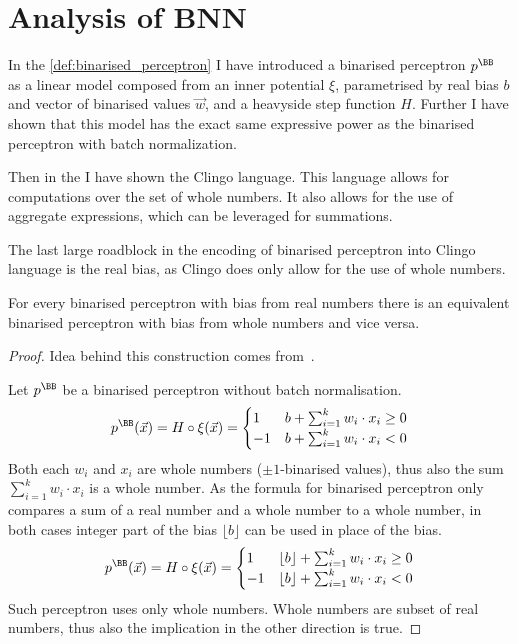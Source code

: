 \section{Analysis of BNN}

In the \cref{def:binarised_perceptron} I have introduced a binarised perceptron $p^\BB$
as a linear model composed from an inner potential $\xi$, parametrised by
real bias $b$ and vector of binarised values $\vec w$, and a heavyside step function $H$.
Further I have shown that this model has the exact same expressive power
as the binarised perceptron with batch normalization.

Then in the  I have shown the Clingo language. This language allows
for computations over the set of whole numbers. It also allows for the use
of aggregate expressions, which can be leveraged for summations.

The last large roadblock in the encoding of binarised perceptron into Clingo language
is the real bias, as Clingo does only allow for the use of whole numbers.

\begin{lemma}\label{lem:integer_perceptron}
    For every binarised perceptron with bias from real numbers
    there is an equivalent binarised perceptron
    with bias from whole numbers and vice versa.

    \begin{proof}
        Idea behind this construction comes from~\cite{zhang2021bdd4bnn}.

        Let $p^\BB$ be a binarised perceptron without batch normalisation.
        \[p^\BB(\vec x) = H \circ \xi (\vec x) = \begin{cases}
            1 & b + \sum_{i=1}^k w_i \cdot x_i \geq 0\\
            -1 & b + \sum_{i=1}^k w_i \cdot x_i < 0\\
        \end{cases}\]
        Both each $w_i$ and $x_i$ are whole numbers ($\pm 1$-binarised values),
        thus also the sum $\sum_{i=1}^k w_i \cdot x_i$ is a whole number.
        As the formula for binarised perceptron only compares a sum of a real
        number and a whole number to a whole number, in both cases integer part
        of the bias $\lfloor b\rfloor$ can be used in place of the bias.
        \[p^\BB(\vec x) = H \circ \xi (\vec x) = \begin{cases}
            1 & \lfloor b\rfloor + \sum_{i=1}^k w_i \cdot x_i \geq 0\\
            -1 & \lfloor b\rfloor + \sum_{i=1}^k w_i \cdot x_i < 0\\
        \end{cases}\]
        Such perceptron uses only whole numbers.
        Whole numbers are subset of real numbers, thus also the implication
        in the other direction is true.
    \end{proof}
\end{lemma}

